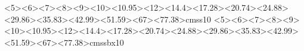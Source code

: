 \documentclass[12pt,a4paper,oneside,naustrian]{amsbook}
\numberwithin{section}{chapter}
\numberwithin{equation}{section}
\numberwithin{figure}{section}
\theoremstyle{plain}
\theoremstyle{plain}
\begin{document}
\leftmargin 0cm
\textwidth 16.7cm
\textheight 23cm
\topmargin -2.7cm
\oddsidemargin 0.1cm
\parindent 0pt

\def\title{4D Druck im Unterricht:\\ Fraktale in der Unterstufe}
\def\name{A.~B.~Conrad Dachsteiner}
\def\institute{Institut für \\Didaktik der Mathematik}
\def\supervisor{Dr.~Zoltán Kovács}
\def\assist{Dr.~Zsolt Lavicza}
\def\date{Juni 2025}

\thispagestyle{empty}
\def\ifundefined#1{\expandafter\ifx\csname#1\endcsname\relax}
  {<5><6><7><8><9><10><10.95><12><14.4><17.28><20.74><24.88><29.86><35.83><42.99><51.59><67><77.38>cmss10}{}
  {<5><6><7><8><9><10><10.95><12><14.4><17.28><20.74><24.88><29.86><35.83><42.99><51.59><67><77.38>cmssbx10}{}
\makeatletter
\def\Huge{\@setfontsize\Huge{29.86pt}{36}}
\makeatother
\unitlength 1cm
\sffamily
\end{document}
